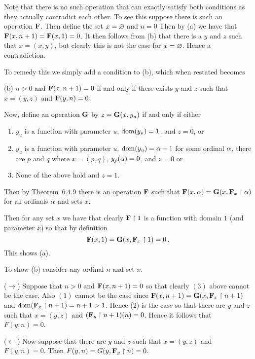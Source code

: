 
\begin{solution}
    \def\G{\prop{G}}
    \def\F{\prop{F}}
    Note that there is no such operation that can exactly satisfy both conditions as they actually contradict each other.
    To  see this suppose there is such an operation $\F$.
    Then define the set $x = \varnothing$ and $n = 0$
    Then by (a) we have that $\F(x,n+1) = \F(x, 1) = 0$.
    It then follows from (b) that there is a $y$ and $z$ such that $x = (x,y)$, but clearly this is not the case for $x=\varnothing$.
    Hence a contradiction.

    To remedy this we simply add a condition to (b), which when restated becomes

    (b) $n > 0$ and $\F(x,n+1) = 0$ if and only if there exists $y$ and $z$ such that $x = (y,z)$ and $\F(y,n) = 0$.

	Now, define an operation $\G$ by $z = \G(x,y_u)$ if and only if either
    \begin{enumerate}
        \item $y_u$ is a function with parameter $u$, $\mathrm{dom}(y_u) = 1$, and $z = 0$, or
        \item $y_u$ is a function with parameter $u$, $\mathrm{dom}(y_u) = \alpha+1$ for some ordinal $\alpha$, there are $p$ and $q$ where $x = (p,q)$, $y_p(\alpha) = 0$, and $z = 0$ or
        \item None of the above hold and $z = 1$.
    \end{enumerate}

    Then by Theorem~6.4.9 there is an operation $\F$ such that $\F(x,\a) = \G(x, \F_x \rest \a)$ for all ordinals $\alpha$ and sets $x$.

    Then for any set $x$ we have that clearly $\F \rest 1$ is a function with domain $1$ (and parameter $x$) so that by definition
    $$
    \F(x,1) = \G(x, \F_x \rest 1) = 0 \,.
    $$
    This shows (a).

    To show (b) consider any ordinal $n$ and set $x$.

    ($\to$) Suppose that $n > 0$ and $\F(x,n+1) = 0$ so that clearly $(3)$ above cannot be the case.
    Also $(1)$ cannot be the case since $\F(x,n+1) = \G(x, \F_x \rest n+1)$ and $\dom(\F_x \rest n+1) = n + 1 > 1$.
    Hence (2) is the case so that there are $y$ and $z$ such that $x = (y,z)$ and $(\F_y \rest n+1)(n) = 0$.
    Hence it follows that $F(y,n) = 0$.

    ($\leftarrow$) Now suppose that there are $y$ and $z$ such that $x = (y,z)$ and $F(y,n) = 0$.
    Then $F(y,n) = G(y, \F_y \rest n) = 0$.


\end{solution}
